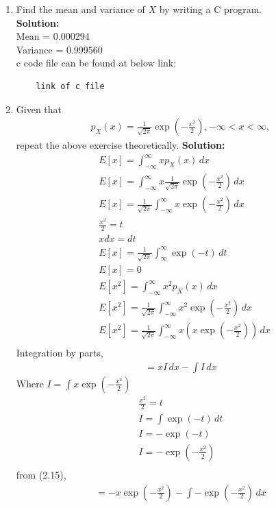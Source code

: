 \documentclass[journal,12pt,twocolumn]{IEEEtran}
\renewcommand\thesection{\arabic{section}}
\providecommand{\brak}[1]{\ensuremath{\left(#1\right)}}
\theoremstyle{remark}
\newcommand{\solution}{\noindent \textbf{Solution: }}
\numberwithin{equation}{section}
\begin{document}
\begin{enumerate}[label=\thesection.\arabic*
,ref=\thesection.\theenumi]
\item Find the mean and variance of $X$ by writing a C program. \\
\solution \\
 Mean = 0.000294 \\
 Variance = 0.999560 \\
 c code file can be found at below link:
\begin{lstlisting}
	link of c file
\end{lstlisting}
\item Given that 
\begin{align}
p_{X}(x) = \frac{1}{\sqrt{2\pi}}\exp\brak{-\frac{x^2}{2}}, -\infty < x < \infty,
\end{align}
repeat the above exercise theoretically.
\solution
\begin{align}
	&E[x] = \int_{-\infty}^{\infty} xp_X(x) \,dx \\
	&E[x] = \int_{-\infty}^{\infty} x\frac{1}{\sqrt{2\pi}}\exp\brak{-\frac{x^2}{2}} \,dx \\
	&E[x] = \frac{1}{\sqrt{2\pi}}\int_{-\infty}^{\infty} x\exp\brak{-\frac{x^2}{2}} \,dx \\
	&\frac{x^2}{2} = t \\
	&xdx = dt \\
	&E[x] = \frac{1}{\sqrt{2\pi}} \int_{\infty}^{\infty} \exp(-t) \, dt \\
	&E[x] = 0 \\
	&E[x^2] = \int_{-\infty}^{\infty} x^2p_X(x) \,dx \\
	&E[x^2] = \frac{1}{\sqrt{2\pi}}\int_{-\infty}^{\infty} x^2 \exp\brak{-\frac{x^2}{2}}\,dx \\
	&E[x^2] = \frac{1}{\sqrt{2\pi}}\int_{-\infty}^{\infty} x\left(x \exp\brak{-\frac{x^2}{2}}\right)\,dx \\
\end{align}
Integration by parts,
\begin{align}
	 = x I \,dx - \int I \,dx 
\end{align}
Where $I = \int x \exp\brak{-\frac{x^2}{2}}$ \\
\begin{align}
	\frac{x^2}{2} = t \\
	I = \int \exp(-t) \, dt \\
	I = -\exp(-t) \\
	I = -\exp\brak{-\frac{x^2}{2}} \\
\end{align}
from (2.15),
\begin{align}
	 = -x\exp\brak{-\frac{x^2}{2}} - \int -\exp\brak{-\frac{x^2}{2}} \,dx \\

\end{align}
\end{enumerate}
\end{document}
